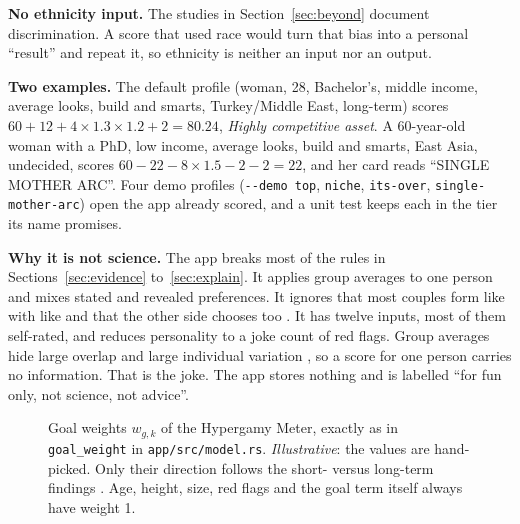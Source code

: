 \documentclass[conference,a4paper]{IEEEtran}
\begin{document}
\textbf{No ethnicity input.} The studies in Section~\ref{sec:beyond} document discrimination. A score that used race would turn that bias into a personal ``result'' and repeat it, so ethnicity is neither an input nor an output.

\textbf{Two examples.} The default profile (woman, 28, Bachelor's, middle income, average looks, build and smarts, Turkey/Middle East, long-term) scores $60+12+4\times1.3\times1.2+2=80.24$, \emph{Highly competitive asset}. A 60-year-old woman with a PhD, low income, average looks, build and smarts, East Asia, undecided, scores $60-22-8\times1.5-2-2=22$, and her card reads ``SINGLE MOTHER ARC''. Four demo profiles (\texttt{-{}-demo top}, \texttt{niche}, \texttt{its-over}, \texttt{single-mother-arc}) open the app already scored, and a unit test keeps each in the tier its name promises.

\textbf{Why it is not science.} The app breaks most of the rules in Sections~\ref{sec:evidence} to~\ref{sec:explain}. It applies group averages to one person and mixes stated and revealed preferences. It ignores that most couples form like with like \cite{kalmijn1998,conroybeam2019sr,horwitz2023} and that the other side chooses too \cite{kreager2014,antfolk2017}. It has twelve inputs, most of them self-rated, and reduces personality to a joke count of red flags. Group averages hide large overlap and large individual variation \cite{walter2020,conroybeam2015}, so a score for one person carries no information. That is the joke. The app stores nothing and is labelled ``for fun only, not science, not advice''.

\begin{figure}[t]
\centering

\caption{Goal weights $w_{g,k}$ of the Hypergamy Meter, exactly as in \texttt{goal\_weight} in \texttt{app/src/model.rs}. \emph{Illustrative}: the values are hand-picked. Only their direction follows the short- versus long-term findings \cite{kenrick1990,likenrick2006}. Age, height, size, red flags and the goal term itself always have weight 1.}
\label{fig:goal}
\end{figure}
\end{document}
